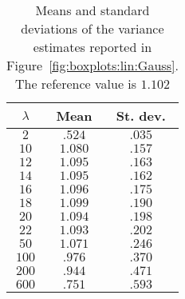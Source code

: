 \begin{table}[H] 
\begin{center}
\begin{tabular}{c|c|c} \toprule
    $\lambda$ & Mean & St. dev. \\ \midrule 
    $2$     & $.524$   & $.035$ \\
    $10$   & $1.080$ & $.157$ \\ 
    $12$   & $1.095$ & $.163$ \\
    $14$   & $1.095$& $.162$ \\
    $16$   & $1.096$ & $.175$ \\
    $18$   & $1.099$ & $.190$ \\
    $20$   & $1.094$ & $.198$ \\
    $22$   & $1.093$ & $.202$ \\
    $50$   & $1.071$ & $.246$ \\
    $100$ & $.976$   & $.370$ \\
    $200$ & $.944$   & $.471$ \\
    $600$ & $.751$   & $.593$ \\
\bottomrule
%
\end{tabular} 
\end{center}
\caption{Means and standard deviations of the variance estimates reported in Figure~\ref{fig:boxplots:lin:Gauss}. The reference value is $1.102$} 
\label{tab:lags:means:stds:lin:Gauss}
\end{table}

